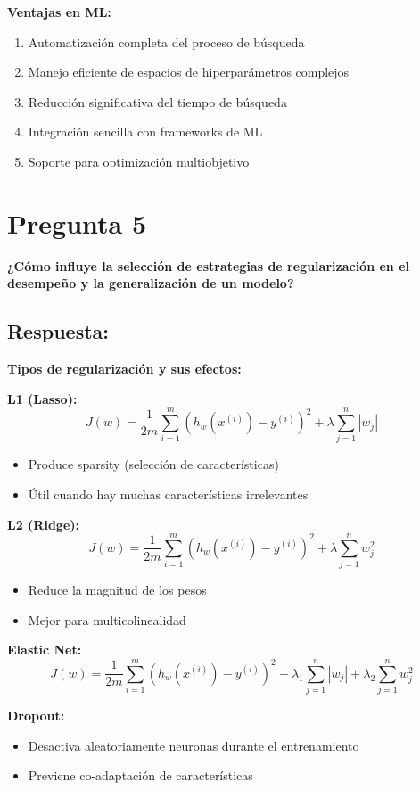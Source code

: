 \documentclass[12pt]{article}
\begin{document}
\textbf{Ventajas en ML:}
\begin{enumerate}
    \item Automatización completa del proceso de búsqueda
    \item Manejo eficiente de espacios de hiperparámetros complejos
    \item Reducción significativa del tiempo de búsqueda
    \item Integración sencilla con frameworks de ML
    \item Soporte para optimización multiobjetivo
\end{enumerate}

\section*{Pregunta 5}
\textbf{¿Cómo influye la selección de estrategias de regularización en el desempeño y la generalización de un modelo?}

\subsection*{Respuesta:}

\textbf{Tipos de regularización y sus efectos:}

\textbf{L1 (Lasso):}
$$J(w) = \frac{1}{2m}\sum_{i=1}^m (h_w(x^{(i)}) - y^{(i)})^2 + \lambda\sum_{j=1}^n |w_j|$$
\begin{itemize}
    \item Produce sparsity (selección de características)
    \item Útil cuando hay muchas características irrelevantes
\end{itemize}

\textbf{L2 (Ridge):}
$$J(w) = \frac{1}{2m}\sum_{i=1}^m (h_w(x^{(i)}) - y^{(i)})^2 + \lambda\sum_{j=1}^n w_j^2$$
\begin{itemize}
    \item Reduce la magnitud de los pesos
    \item Mejor para multicolinealidad
\end{itemize}

\textbf{Elastic Net:}
$$J(w) = \frac{1}{2m}\sum_{i=1}^m (h_w(x^{(i)}) - y^{(i)})^2 + \lambda_1\sum_{j=1}^n |w_j| + \lambda_2\sum_{j=1}^n w_j^2$$

\textbf{Dropout:}
\begin{itemize}
    \item Desactiva aleatoriamente neuronas durante el entrenamiento
    \item Previene co-adaptación de características
\end{itemize}
\end{document}
